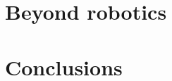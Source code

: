 \section{Beyond robotics}
\TODO

\section{Conclusions}\label{sec:conclusion}



\printbibliography 
